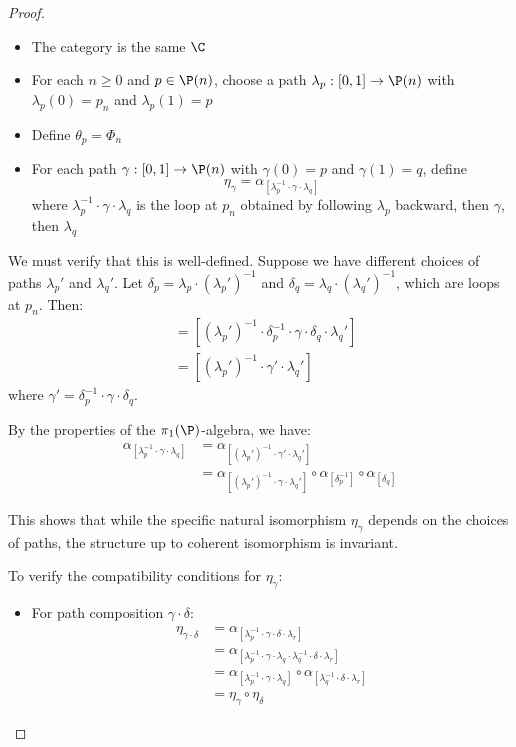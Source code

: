 \begin{proof}
\begin{itemize}
    \item The category is the same $\C$
    \item For each $n \geq 0$ and $p \in \P(n)$, choose a path $\lambda_p: [0,1] \to \P(n)$ with $\lambda_p(0) = p_n$ and $\lambda_p(1) = p$
    \item Define $\theta_p = \Phi_n$
    \item For each path $\gamma: [0,1] \to \P(n)$ with $\gamma(0) = p$ and $\gamma(1) = q$, define
    \begin{equation}
        \eta_\gamma = \alpha_{[\lambda_p^{-1} \cdot \gamma \cdot \lambda_q]}
    \end{equation}
    where $\lambda_p^{-1} \cdot \gamma \cdot \lambda_q$ is the loop at $p_n$ obtained by following $\lambda_p$ backward, then $\gamma$, then $\lambda_q$
\end{itemize}

We must verify that this is well-defined. Suppose we have different choices of paths $\lambda_p'$ and $\lambda_q'$. Let $\delta_p = \lambda_p \cdot (\lambda_p')^{-1}$ and $\delta_q = \lambda_q \cdot (\lambda_q')^{-1}$, which are loops at $p_n$. Then:
\begin{align}
    [\lambda_p^{-1} \cdot \gamma \cdot \lambda_q] &= [(\lambda_p')^{-1} \cdot \delta_p^{-1} \cdot \gamma \cdot \delta_q \cdot \lambda_q'] \\
    &= [(\lambda_p')^{-1} \cdot \gamma' \cdot \lambda_q']
\end{align}
where $\gamma' = \delta_p^{-1} \cdot \gamma \cdot \delta_q$.

By the properties of the $\pi_1(\P)$-algebra, we have:
\begin{align}
    \alpha_{[\lambda_p^{-1} \cdot \gamma \cdot \lambda_q]} &= \alpha_{[(\lambda_p')^{-1} \cdot \gamma' \cdot \lambda_q']} \\
    &= \alpha_{[(\lambda_p')^{-1} \cdot \gamma \cdot \lambda_q']} \circ \alpha_{[\delta_p^{-1}]} \circ \alpha_{[\delta_q]}
\end{align}

This shows that while the specific natural isomorphism $\eta_\gamma$ depends on the choices of paths, the structure up to coherent isomorphism is invariant.

To verify the compatibility conditions for $\eta_\gamma$:

\begin{itemize}
    \item For path composition $\gamma \cdot \delta$:
    \begin{align}
        \eta_{\gamma \cdot \delta} &= \alpha_{[\lambda_p^{-1} \cdot \gamma \cdot \delta \cdot \lambda_r]} \\
        &= \alpha_{[\lambda_p^{-1} \cdot \gamma \cdot \lambda_q \cdot \lambda_q^{-1} \cdot \delta \cdot \lambda_r]} \\
        &= \alpha_{[\lambda_p^{-1} \cdot \gamma \cdot \lambda_q]} \circ \alpha_{[\lambda_q^{-1} \cdot \delta \cdot \lambda_r]} \\
        &= \eta_\gamma \circ \eta_\delta
    \end{align}
    

\end{itemize}
\end{proof}
